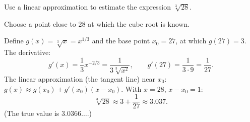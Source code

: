 
\begin{question}
Use a linear approximation to estimate the expression $\sqrt[3]{28}$.
\end{question}

\begin{hint}
Choose a point close to $28$ at which the cube root is known.
\end{hint}

\begin{solution}
Define $g(x)=\sqrt[3]{x}=x^{1/3}$ and the base point $x_0=27$, at which $g(27)=3$. The derivative:
\[ g'(x)=\frac{1}{3}x^{-2/3}=\frac{1}{3\sqrt[3]{x^2}},\qquad g'(27)=\frac{1}{3\cdot 9}=\frac{1}{27}. \]
The linear approximation (the tangent line) near $x_0$: $g(x)\approx g(x_0)+g'(x_0)(x-x_0)$. With $x=28$, $x-x_0=1$:
\[ \sqrt[3]{28}\approx 3+\frac{1}{27}\approx 3.037. \]
(The true value is $3.0366\ldots$.)
\end{solution}
